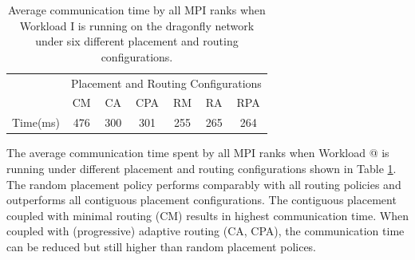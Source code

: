\documentclass[conference,compsoc]{IEEEtran}
\makeatletter
\newcommand{\Rmnum}[1]{\expandafter\@slowromancap\romannumeral #1@}
\makeatother
\begin{document}
\begin{table}[ht]
\begin{center}
\caption{Average communication time by all MPI ranks when Workload I is running on the dragonfly network under six different placement and routing configurations.} 
\label{tab:wkld-commtime}
\begin{tabular}{l c c c c c c }
\toprule %
\toprule
&\multicolumn{6}{c}{Placement and Routing Configurations} \\ 
\cmidrule(l){2-7}
	      & CM & CA & CPA & RM & RA & RPA \\ %
\midrule %
Time(ms)  & 476  & 300  & 301  & 255  & 265  & 264  \\ %

\midrule %
\bottomrule %
\end{tabular}
\end{center}
\end{table}

The average communication time spent by all MPI ranks when Workload \Rmnum{1} is running under different placement and routing configurations shown in Table \ref{tab:wkld-commtime}. The random placement policy performs comparably with all routing policies and outperforms all contiguous placement configurations. The contiguous placement coupled with minimal routing (CM) results in highest communication time. When coupled with (progressive) adaptive routing (CA, CPA), the communication time can be reduced but still higher than random placement polices. 
\end{document}
